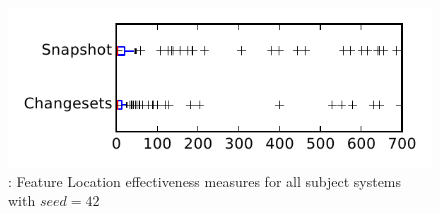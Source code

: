 
\begin{figure}
\centering
\includegraphics[height=0.4\textheight]{figures/flt_seed/rq1_tiny_42}
\caption{\rone: Feature Location effectiveness measures for all subject systems with $seed=42$}
\label{fig:flt_seed:rq1:tiny}
\end{figure}
